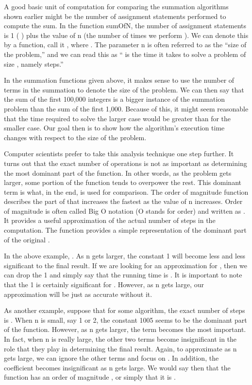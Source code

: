 A good basic unit of computation for comparing the summation algorithms shown earlier might be the number of assignment statements performed to compute the sum. In the function sumOfN, the number of assignment statements is 1 (
) plus the value of n (the number of times we perform ). We can denote this by a function, call it , where . The parameter n is often referred to as the ``size of the problem,'' and we can read this as “ is the time it takes to solve a problem of size , namely
steps.”

In the summation functions given above, it makes sense to use the number of terms in the summation to denote the size of the problem. We can then say that the sum of the first 100,000 integers is a bigger instance of the summation problem than the sum of the first 1,000. Because of this, it might seem reasonable that the time required to solve the larger case would be greater than for the smaller case. Our goal then is to show how the algorithm’s execution time changes with respect to the size of the problem.

Computer scientists prefer to take this analysis technique one step further. It turns out that the exact number of operations is not as important as determining the most dominant part of the
function. In other words, as the problem gets larger, some portion of the function tends to overpower the rest. This dominant term is what, in the end, is used for comparison. The order of magnitude function describes the part of that increases the fastest as the value of n increases. Order of magnitude is often called Big O notation (O stands for order) and written as . It provides a useful approximation of the actual number of steps in the computation. The function provides a simple representation of the dominant part of the original .

In the above example, . As n gets larger, the constant 1 will become less and less significant to the final result. If we are looking for an approximation for , then we can drop the 1 and simply say that the running time is . It is important to note that the 1 is certainly significant for .
However, as n gets large, our approximation will be just as accurate without it.

As another example, suppose that for some algorithm, the exact number of steps is .
When n is small, say 1 or 2, the constant 1005 seems to be the dominant part of the function. However, as n gets larger, the term becomes the most important. In fact, when n is really large, the other two terms become insignificant in the role that they play in determining the final result. Again, to approximate as n gets large, we can ignore the other terms and focus on . In addition, the coefficient becomes insignificant as n gets large. We would say then that the function has an order of magnitude , or simply that it is .

